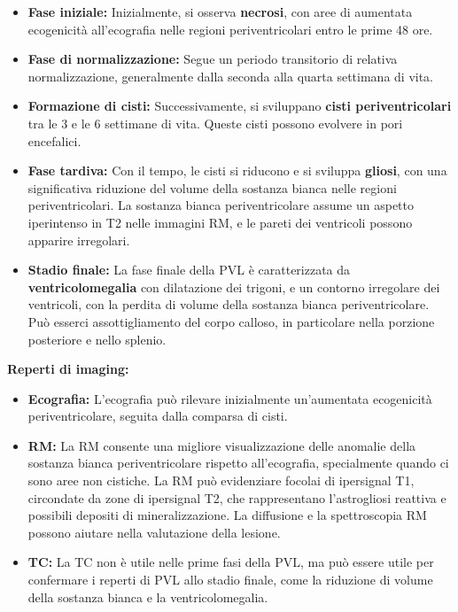 \begin{itemize}
	\tightlist
	\item
	\textbf{Fase iniziale:} Inizialmente, si osserva \textbf{necrosi}, con aree di aumentata ecogenicità all'ecografia nelle regioni periventricolari entro le prime 48 ore.
	\item
	\textbf{Fase di normalizzazione:} Segue un periodo transitorio di relativa normalizzazione, generalmente dalla seconda alla quarta settimana di vita.
	\item
	\textbf{Formazione di cisti:} Successivamente, si sviluppano \textbf{cisti periventricolari} tra le 3 e le 6 settimane di vita. Queste cisti possono evolvere in pori encefalici.
	\item
	\textbf{Fase tardiva:} Con il tempo, le cisti si riducono e si sviluppa \textbf{gliosi}, con una significativa riduzione del volume della sostanza bianca nelle regioni periventricolari. La sostanza bianca periventricolare assume un aspetto iperintenso in T2 nelle immagini RM, e le pareti dei ventricoli possono apparire irregolari.
	\item
	\textbf{Stadio finale:} La fase finale della PVL è caratterizzata da \textbf{ventricolomegalia} con dilatazione dei trigoni, e un contorno irregolare dei ventricoli, con la perdita di volume della sostanza bianca periventricolare. Può esserci assottigliamento del corpo calloso, in particolare nella porzione posteriore e nello splenio.
\end{itemize}

\textbf{Reperti di imaging:}

\begin{itemize}
	\tightlist
	\item
	\textbf{Ecografia:} L'ecografia può rilevare inizialmente un'aumentata ecogenicità periventricolare, seguita dalla comparsa di cisti.
	\item
	\textbf{RM:} La RM consente una migliore visualizzazione delle anomalie della sostanza bianca periventricolare rispetto all'ecografia, specialmente quando ci sono aree non cistiche. La RM può evidenziare focolai di ipersignal T1, circondate da zone di ipersignal T2, che rappresentano l'astrogliosi reattiva e possibili depositi di mineralizzazione. La diffusione e la spettroscopia RM possono aiutare nella valutazione della lesione.
	\item
	\textbf{TC:} La TC non è utile nelle prime fasi della PVL, ma può essere utile per confermare i reperti di PVL allo stadio finale, come la riduzione di volume della sostanza bianca e la ventricolomegalia.
\end{itemize}

